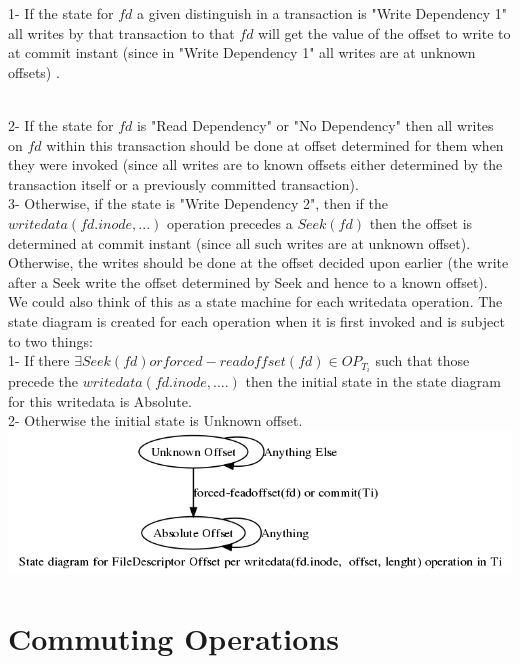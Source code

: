 \documentclass[a4paper, 11pt]{article}
\begin{document}
1- If the state for $fd$ a given distinguish in a transaction is "Write Dependency 1" all writes by that transaction to that $fd$ will get the value of the offset to write to at commit instant (since in "Write Dependency 1" all writes are at unknown offsets) .\\\

2- If the state for $fd$ is "Read Dependency"  or "No Dependency" then all writes on $fd$ within this transaction should be done at offset determined for them when they were invoked (since all writes are to known offsets either determined by the transaction itself or a previously committed transaction).\\

3- Otherwise, if the state is "Write Dependency 2", then if the $writedata(fd.inode,...)$ operation precedes a $Seek(fd)$ then the offset is determined at commit instant (since all such writes are at unknown offset). Otherwise, the writes should be done at the offset decided upon earlier (the write after a Seek write the offset determined by Seek and hence to a known offset).\\


We could also think of this as a state machine for each writedata operation. The state diagram is created for each operation when it is first invoked and is subject to two things:\\

1- If there $\exists Seek(fd) or forced-readoffset(fd)\in OP_{T_i}$ such that those precede the $writedata(fd.inode,....)$ then the initial state in the state diagram for this writedata is Absolute.\\

2- Otherwise the initial state is Unknown offset.\\

\includegraphics[scale = 0.3]{hello2.png}\\

\section{Commuting Operations}
\end{document}
